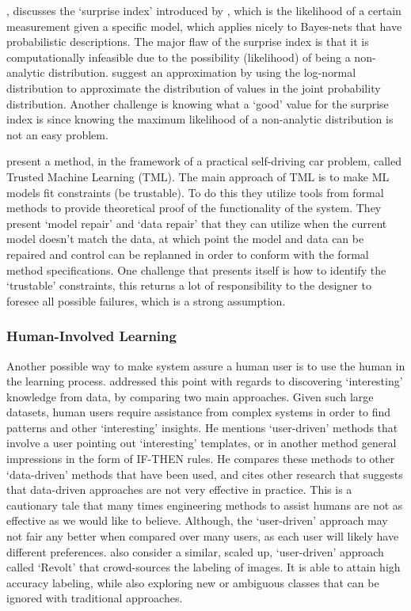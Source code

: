     \citet{Zagorecki2015-qy}, discusses the `surprise index' introduced by \citet{Habbema1976-xd}, which is the likelihood of a certain measurement given a specific model, which applies nicely to Bayes-nets that have probabilistic descriptions. The major flaw of the surprise index is that it is computationally infeasible due to the possibility (likelihood) of being a non-analytic distribution. \citeauthor{Zagorecki2015-qy} suggest an approximation by using the log-normal distribution to approximate the distribution of values in the joint probability distribution. Another challenge is knowing what a `good' value for the surprise index is since knowing the maximum likelihood of a non-analytic distribution is not an easy problem.

    \citet{Ghosh2016-dl} present a method, in the framework of a practical self-driving car problem, called Trusted Machine Learning (TML). The main approach of TML is to make ML models fit constraints (be trustable). To do this they utilize tools from formal methods to provide theoretical proof of the functionality of the system. They present `model repair' and `data repair' that they can utilize when the current model doesn't match the data, at which point the model and data can be repaired and control can be replanned in order to conform with the formal method specifications. One challenge that presents itself is how to identify the `trustable' constraints, this returns a lot of responsibility to the designer to foresee all possible failures, which is a strong assumption.

\subsubsection{Human-Involved Learning} \label{sec:human_involved}
    Another possible way to make system assure a human user is to use the human in the learning process. \citet{Freitas2006-qo} addressed this point with regards to discovering `interesting' knowledge from data, by comparing two main approaches. Given such large datasets, human users require assistance from complex systems in order to find patterns and other `interesting' insights. He mentions `user-driven' methods that involve a user pointing out `interesting' templates, or in another method general impressions in the form of IF-THEN rules. He compares these methods to other `data-driven' methods that have been used, and cites other research that suggests that data-driven approaches are not very effective in practice. This is a cautionary tale that many times engineering methods to assist humans are not as effective as we would like to believe. Although, the `user-driven' approach may not fair any better when compared over many users, as each user will likely have different preferences. \citet{Chang2017-kl} also consider a similar, scaled up, `user-driven' approach called `Revolt' that crowd-sources the labeling of images. It is able to attain high accuracy labeling, while also exploring new or ambiguous classes that can be ignored with traditional approaches.

